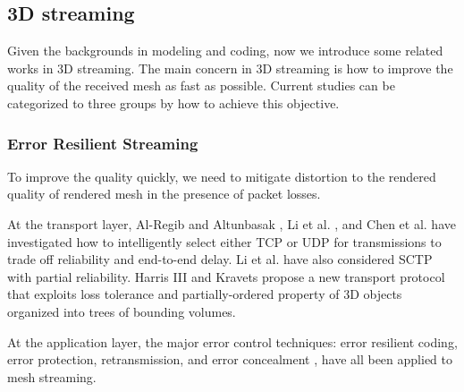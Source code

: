 \documentclass[11pt, a4paper]{report}
\begin{document}
    \subsection{3D streaming}
    \label{ss:intro:streaming}
    Given the backgrounds in modeling and coding, now we introduce some
    related works in 3D streaming. 
    The main concern in 3D streaming is how to improve the quality of the received
    mesh as fast as possible. Current studies can be categorized to three groups
    by how to achieve this objective.
    
    \subsubsection{Error Resilient Streaming}
    To improve the quality quickly, we need to mitigate distortion to the 
    rendered quality of rendered mesh in the presence of packet losses.

    At the transport layer, Al-Regib and Altunbasak \cite{3tpregib}, Li
    et al. \cite{Li2006}, and Chen et al. \cite{chen05hybrid} have
    investigated how to intelligently select either TCP or UDP for
    transmissions to trade off reliability and end-to-end delay.  Li et
    al. have also considered SCTP with partial reliability.
    Harris III and Kravets \cite{harris:design} propose a new
    transport protocol that exploits loss tolerance and
    partially-ordered property of 3D objects organized into trees of
    bounding volumes.

    At the application layer, the major error control techniques: error
    resilient coding, error protection, retransmission, and error
    concealment \cite{Park2003}, have all been applied to mesh streaming.  
    
\end{document}
